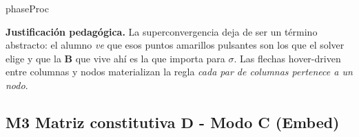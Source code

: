 \documentclass[11pt,a4paper]{article}
\begin{document}
\begin{moduleBox}{phaseProc}
\begin{center}
\end{center}

\textbf{Justificación pedagógica.} La superconvergencia deja de ser un
término abstracto: el alumno \emph{ve} que esos puntos amarillos pulsantes
son los que el solver elige y que la $\mathbf{B}$ que vive ahí es la que
importa para $\sigma$. Las flechas hover-driven entre columnas y nodos
materializan la regla \emph{cada par de columnas pertenece a un nodo}.

\end{moduleBox}

\subsection{M3 \textbar{} Matriz constitutiva $\mathbf{D}$ - Modo C (Embed)}
\end{document}
